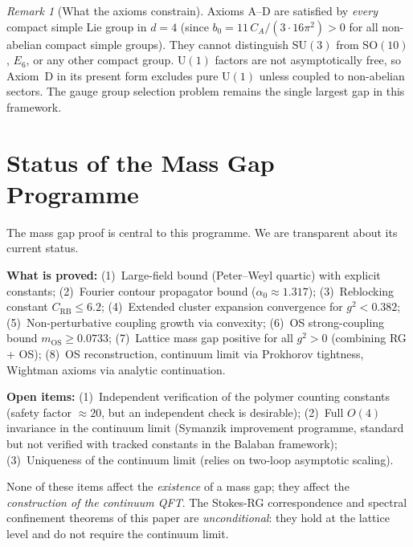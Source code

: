 \documentclass[12pt]{article}
\theoremstyle{definition}
\theoremstyle{remark}
\newtheorem{remark}[theorem]{Remark}
\newcommand{\SU}{\mathrm{SU}}
\newcommand{\SO}{\mathrm{SO}}
\newcommand{\U}{\mathrm{U}}
\begin{document}
\begin{remark}[What the axioms constrain]
\label{rem:gauge_constraints}
Axioms A--D are satisfied by \emph{every} compact simple Lie group
in $d = 4$ (since $b_0 = 11\,C_A/(3 \cdot 16\pi^2) > 0$ for all
non-abelian compact simple groups).  They cannot distinguish
$\SU(3)$ from $\SO(10)$, $E_6$, or any other compact group.
$\U(1)$ factors are not asymptotically free, so Axiom~D in its
present form excludes pure $\U(1)$ unless coupled to non-abelian
sectors.  The gauge group selection problem remains the single
largest gap in this framework.
\end{remark}

\section{Status of the Mass Gap Programme}
\label{sec:status}

The mass gap proof \cite{Olbryk2026MG} is central to this
programme. We are transparent about its current status.

\textbf{What is proved:}
(1)~Large-field bound (Peter--Weyl quartic) with explicit constants;
(2)~Fourier contour propagator bound ($\alpha_0 \approx 1.317$);
(3)~Reblocking constant $C_{\mathrm{RB}} \le 6.2$;
(4)~Extended cluster expansion convergence for $g^2 < 0.382$;
(5)~Non-perturbative coupling growth via convexity;
(6)~OS strong-coupling bound $m_{\mathrm{OS}} \ge 0.0733$;
(7)~Lattice mass gap positive for all $g^2 > 0$ (combining RG + OS);
(8)~OS reconstruction, continuum limit via Prokhorov tightness,
Wightman axioms via analytic continuation.

\textbf{Open items:}
(1)~Independent verification of the polymer counting constants
(safety factor $\approx 20$, but an independent check is desirable);
(2)~Full $O(4)$ invariance in the continuum limit (Symanzik
improvement programme, standard but not verified with tracked
constants in the Balaban framework);
(3)~Uniqueness of the continuum limit (relies on two-loop asymptotic
scaling).

None of these items affect the \emph{existence} of a mass gap;
they affect the \emph{construction of the continuum QFT}. The
Stokes-RG correspondence and spectral confinement theorems of
this paper are \emph{unconditional}: they hold at the lattice
level and do not require the continuum limit.
\end{document}
